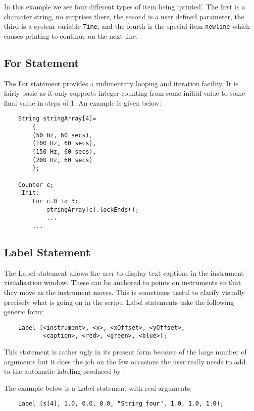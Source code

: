 In this example we see four different types of item being `printed'.
The first is a character string, no surprises there, the second is
a user defined parameter, the third is a system variable \verb|Time|,
and the fourth is the special item \verb|newline| which causes printing
to continue on the next line.

\subsection{For Statement}
\label{section:for_statement}
The For statement provides a rudimentary looping and iteration
facility. It is fairly basic as it only supports integer counting
from some initial value to some final value in steps of 1. An example
is given below:

\begin{verbatim}
    String stringArray[4]=
        {
        (50 Hz, 60 secs), 
        (100 Hz, 60 secs), 
        (150 Hz, 60 secs), 
        (200 Hz, 60 secs)
        };
     
    Counter c;
     Init:
        For c=0 to 3:
            stringArray[c].lockEnds();
            ...
        ... 
\end{verbatim}

\subsection{Label Statement}
\label{section:label_statement}
The Label statement allows the user to display text captions in the instrument
visualisation window. These  can be anchored to points on instruments
so that they move as the instrument moves. This is sometimes useful to clarify
visually precisely what is going on in the script. Label statements take
the following generic form:

\begin{verbatim}
    Label (<instrument>, <x>, <xOffset>, <yOffset>,
           <caption>, <red>, <green>, <blue>);
\end{verbatim}

This statement is rather ugly in its present form because of the large
number of arguments but it does the job on the few occasions the user
really needs to add to the automatic labeling produced by \tao.

The example below is a Label statement with real arguments:

\begin{verbatim}
    Label (s[4], 1.0, 0.0, 0.0, "String four", 1.0, 1.0, 1.0);
\end{verbatim}

